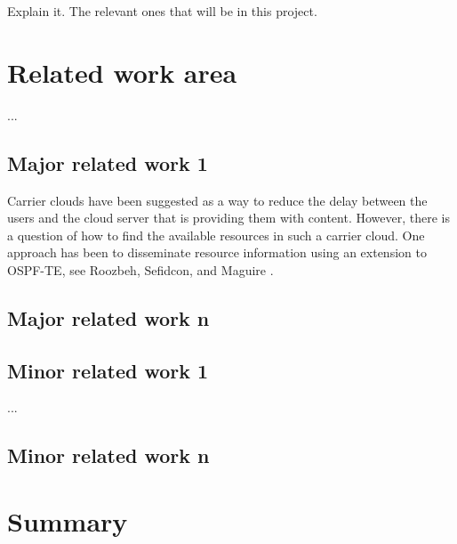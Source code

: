 Explain it. The relevant ones that will be in this project.


\section{Related work area}




...




\subsection{Major related work 1}


Carrier clouds have been suggested as a way to reduce the delay between the users and the cloud server that is providing them with content. However, there is a question of how to find the available resources in such a carrier cloud. One approach has been to disseminate resource information using an extension to OSPF-TE, see Roozbeh, Sefidcon, and Maguire \cite{roozbeh_resource_2013}.


\subsection{Major related work n}


\subsection{Minor related work 1}


...


\subsection{Minor related work n}


\section{Summary}






\cleardoublepage